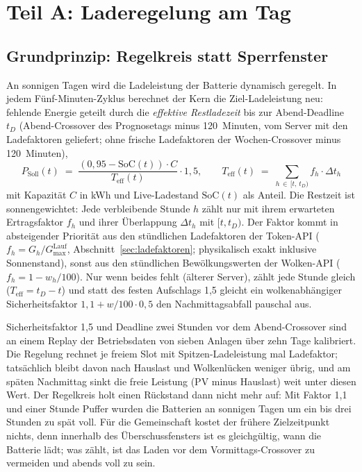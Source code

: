 \documentclass[11pt,a4paper]{article}
\begin{document}
\section{Teil A: Laderegelung am Tag}\label{sec:ladesperre}

\subsection{Grundprinzip: Regelkreis statt Sperrfenster}\label{sec:regelkreis}

An sonnigen Tagen wird die Ladeleistung der Batterie dynamisch geregelt.
In jedem Fünf-Minuten-Zyklus berechnet der Kern die Ziel-Ladeleistung neu:
fehlende Energie geteilt durch die \emph{effektive Restladezeit} bis zur
Abend-Deadline $t_D$ (Abend-Crossover des Prognosetags minus 120~Minuten,
vom Server mit den Ladefaktoren geliefert; ohne frische Ladefaktoren der
Wochen-Crossover minus 120~Minuten),
\begin{equation}
  P_{\text{Soll}}(t) \;=\;
  \frac{(0{,}95 - \text{SoC}(t)) \cdot C}{T_{\text{eff}}(t)} \cdot 1{,}5,
  \qquad
  T_{\text{eff}}(t) \;=\; \sum_{h\,\in\,[t,\,t_D)} f_h \cdot \Delta t_h
  \label{eq:psoll}
\end{equation}
mit Kapazität $C$ in kWh und Live-Ladestand $\text{SoC}(t)$ als Anteil.
Die Restzeit ist sonnengewichtet: Jede verbleibende Stunde $h$ zählt nur
mit ihrem erwarteten Ertragsfaktor $f_h$ und ihrer Überlappung
$\Delta t_h$ mit $[t, t_D)$. Der Faktor kommt in absteigender Priorität
aus den stündlichen Ladefaktoren der Token-API
($f_h = G_h / G_{\max}^{\text{Lauf}}$, Abschnitt~\ref{sec:ladefaktoren};
physikalisch exakt inklusive Sonnenstand), sonst aus den stündlichen
Bewölkungswerten der Wolken-API ($f_h = 1 - w_h/100$). Nur wenn beides
fehlt (älterer Server), zählt jede Stunde gleich
($T_{\text{eff}} = t_D - t$) und statt des festen Aufschlags 1,5 gleicht
ein wolkenabhängiger Sicherheitsfaktor $1{,}1 + w/100 \cdot 0{,}5$ den
Nachmittagsabfall pauschal aus.

Sicherheitsfaktor 1,5 und Deadline zwei Stunden vor dem Abend-Crossover
sind an einem Replay der Betriebsdaten von sieben Anlagen über zehn Tage
kalibriert. Die Regelung rechnet je freiem Slot mit Spitzen-Ladeleistung
mal Ladefaktor; tatsächlich bleibt davon nach Hauslast und Wolkenlücken
weniger übrig, und am späten Nachmittag sinkt die freie Leistung (PV minus
Hauslast) weit unter diesen Wert. Der Regelkreis holt einen Rückstand dann
nicht mehr auf: Mit Faktor 1,1 und einer Stunde Puffer wurden die Batterien
an sonnigen Tagen um ein bis drei Stunden zu spät voll. Für die
Gemeinschaft kostet der frühere Zielzeitpunkt nichts, denn innerhalb des
Überschussfensters ist es gleichgültig, wann die Batterie lädt; was zählt,
ist das Laden vor dem Vormittags-Crossover zu vermeiden und abends voll zu
sein.
\end{document}
